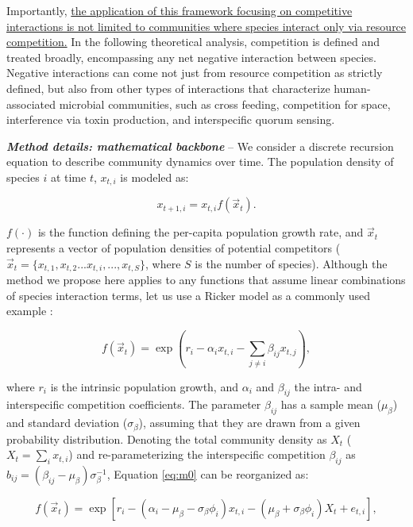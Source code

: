 \documentclass[12pt, class=article, crop=false]{standalone}
\begin{document}
Importantly, \ul{the application of this framework focusing on competitive interactions is not limited to communities where species interact only via resource competition.}
In the following theoretical analysis, competition is defined and treated broadly, encompassing any net negative interaction between species.
Negative interactions can come not just from resource competition as strictly defined, but also from other types of interactions that characterize human-associated microbial communities, such as cross feeding, competition for space, interference via toxin production, and interspecific quorum sensing.

\textbf{\textit{Method details: mathematical backbone}} -- 
We consider a discrete recursion equation to describe community dynamics over time. The population density of species $i$ at time $t$, $x_{t,i}$ is modeled as:

\begin{equation}
\label{eq:m0}
x_{t + 1, i} = x_{t, i} f(\overset{\rightarrow}{x}_{t}).
\end{equation}

$f(\cdot)$ is the function defining the per-capita population growth rate, and $\overset{\rightarrow}{x}_{t}$ represents a vector of population densities of potential competitors ($\overset{\rightarrow}{x}_{t} = \{x_{t,1}, x_{t,2}...x_{t,i},...,x_{t,S}\}$, where $S$ is the number of species).
Although the method we propose here applies to any functions that assume linear combinations of species interaction terms, let us use a Ricker model as a commonly used example \citep{ricker_stock_1954, fowler_species_2012, terui_intentional_2023}:

\begin{equation}
\label{eq:ricker}
f(\overset{\rightarrow}{x}_{t}) = \exp(r_i - \alpha_i x_{t,i} - \sum_{j \ne i} \beta_{ij} x_{t,j}),
\end{equation}

where $r_i$ is the intrinsic population growth, and $\alpha_{i}$ and $\beta_{ij}$ the intra- and interspecific competition coefficients.
The parameter $\beta_{ij}$ has a sample mean ($\mu_{\beta}$) and standard deviation ($\sigma_{\beta}$), assuming that they are drawn from a given probability distribution. 
Denoting the total community density as $X_t$ ($X_t = \sum_i x_{t,i}$) and re-parameterizing the interspecific competition $\beta_{ij}$ as $b_{ij} = (\beta_{ij} - \mu_{\beta}) \sigma_{\beta}^{-1}$, Equation \ref{eq:m0} can be reorganized as:

\begin{equation}
\label{eq:rickermod0}
f(\overset{\rightarrow}{x}_{t}) = \exp\left[r_i - (\alpha_i - \mu_{\beta} - \sigma_{\beta} \phi_i) x_{t,i} - (\mu_{\beta} +  \sigma_{\beta} \phi_i) X_t + e_{t,i} \right],
\end{equation}
\end{document}
